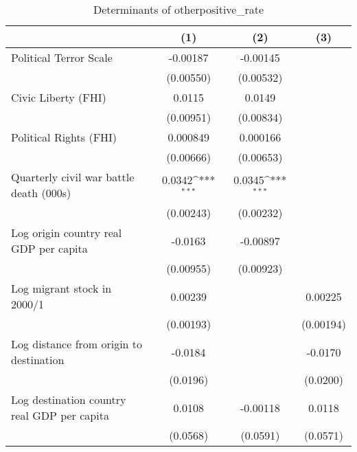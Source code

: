 \begin{table}[htbp]\centering
\def\sym#1{\ifmmode^{#1}\else\(^{#1}\)\fi}
\caption{Determinants of otherpositive\_rate}
\begin{tabular}{l*{3}{c}}
\hline\hline
                    &\multicolumn{1}{c}{(1)}         &\multicolumn{1}{c}{(2)}         &\multicolumn{1}{c}{(3)}         \\
\hline
Political Terror Scale&    -0.00187         &    -0.00145         &                     \\
                    &   (0.00550)         &   (0.00532)         &                     \\
[1em]
Civic Liberty (FHI) &      0.0115         &      0.0149         &                     \\
                    &   (0.00951)         &   (0.00834)         &                     \\
[1em]
Political Rights (FHI)&    0.000849         &    0.000166         &                     \\
                    &   (0.00666)         &   (0.00653)         &                     \\
[1em]
Quarterly civil war battle death (000s)&      0.0342\sym{***}&      0.0345\sym{***}&                     \\
                    &   (0.00243)         &   (0.00232)         &                     \\
[1em]
Log origin country real GDP per capita&     -0.0163         &    -0.00897         &                     \\
                    &   (0.00955)         &   (0.00923)         &                     \\
[1em]
Log migrant stock in 2000/1&     0.00239         &                     &     0.00225         \\
                    &   (0.00193)         &                     &   (0.00194)         \\
[1em]
Log distance from origin to destination&     -0.0184         &                     &     -0.0170         \\
                    &    (0.0196)         &                     &    (0.0200)         \\
[1em]
Log destination country real GDP per capita&      0.0108         &    -0.00118         &      0.0118         \\
                    &    (0.0568)         &    (0.0591)         &    (0.0571)         \\

\end{tabular}
\end{table}
